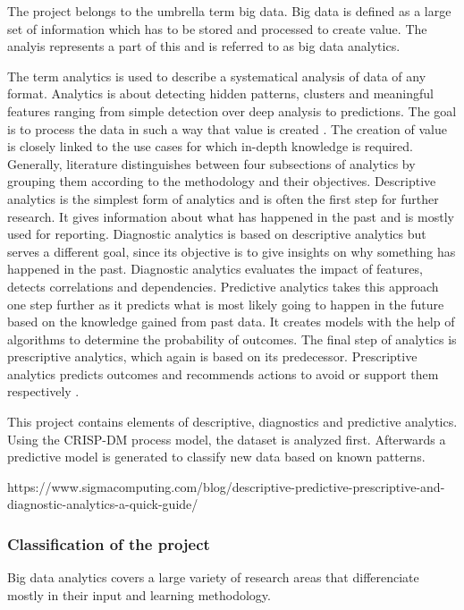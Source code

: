 The project belongs to the umbrella term big data. Big data is defined as a large set of information
which has to be stored and processed to create value. The analyis represents a part of this and is 
referred to as big data analytics. 

The term analytics is used to describe a systematical analysis of data of any format. Analytics is 
about detecting hidden patterns, clusters and meaningful features ranging from simple detection 
over deep analysis to predictions. The goal is to process the data in such a way that value is 
created \cite[p.2]{Tanwar2015} \cite[p.8f]{Meier_2021}. The creation of value is closely linked to 
the use cases for which in-depth knowledge is required. Generally, literature distinguishes 
between four subsections of analytics by grouping them according to the methodology 
and their objectives. Descriptive analytics is the simplest 
form of analytics and is often the first step for further research. It gives 
information about what has happened in the past and is mostly used for reporting. Diagnostic analytics is based on descriptive 
analytics but serves a different goal, since its objective is to give insights on why something has 
happened in the past. Diagnostic analytics evaluates the impact of features, detects correlations 
and dependencies. Predictive analytics takes this approach one step further as it predicts what 
is most likely going to happen in the future based on the knowledge gained from past data. It 
creates models with the help of algorithms to determine the probability of outcomes. The final 
step of analytics is prescriptive analytics, which again is based on its predecessor. Prescriptive 
analytics predicts outcomes and recommends actions to avoid or support them respectively \cite[p.8f]{Meier_2021}.

This project contains elements of descriptive, diagnostics and predictive analytics. Using the 
\ac{CRISP-DM} process model, the dataset is analyzed first. Afterwards a predictive model 
is generated to classify new data based on known patterns.

https://www.sigmacomputing.com/blog/descriptive-predictive-prescriptive-and-diagnostic-analytics-a-quick-guide/

\subsubsection{Classification of the project}

Big data analytics covers a large variety of research areas that differenciate mostly in their input
and learning methodology. 


